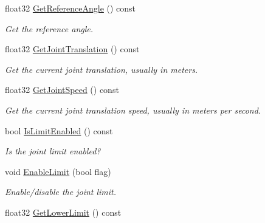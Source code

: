 \begin{DoxyCompactItemize}
float32 \hyperlink{classb2PrismaticJoint_a7b40d88d1bdb18089803d5abc6ba67c5}{Get\+Reference\+Angle} () const
\begin{DoxyCompactList}\small\item\em Get the reference angle. \end{DoxyCompactList}\item 
\mbox{\label{classb2PrismaticJoint_abb008b99fb2df7357e6f3166d3c8b192}} 
float32 \hyperlink{classb2PrismaticJoint_abb008b99fb2df7357e6f3166d3c8b192}{Get\+Joint\+Translation} () const
\begin{DoxyCompactList}\small\item\em Get the current joint translation, usually in meters. \end{DoxyCompactList}\item 
\mbox{\label{classb2PrismaticJoint_af407d14ac024abdee49b852613f1bbc2}} 
float32 \hyperlink{classb2PrismaticJoint_af407d14ac024abdee49b852613f1bbc2}{Get\+Joint\+Speed} () const
\begin{DoxyCompactList}\small\item\em Get the current joint translation speed, usually in meters per second. \end{DoxyCompactList}\item 
\mbox{\label{classb2PrismaticJoint_a22e2442a17832f718447c63c9c6263c8}} 
bool \hyperlink{classb2PrismaticJoint_a22e2442a17832f718447c63c9c6263c8}{Is\+Limit\+Enabled} () const
\begin{DoxyCompactList}\small\item\em Is the joint limit enabled? \end{DoxyCompactList}\item 
\mbox{\label{classb2PrismaticJoint_a6d419afe7bd4b0e36d2e4607df7f79f2}} 
void \hyperlink{classb2PrismaticJoint_a6d419afe7bd4b0e36d2e4607df7f79f2}{Enable\+Limit} (bool flag)
\begin{DoxyCompactList}\small\item\em Enable/disable the joint limit. \end{DoxyCompactList}\item 
\mbox{\label{classb2PrismaticJoint_a10a2d3c03164190d279fa3c72eafb49e}} 
float32 \hyperlink{classb2PrismaticJoint_a10a2d3c03164190d279fa3c72eafb49e}{Get\+Lower\+Limit} () const

\end{DoxyCompactItemize}
